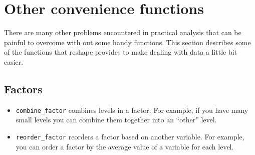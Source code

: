 \documentclass[oneside,letterpaper]{scrartcl}
\begin{document}
%
%

\newpage
\section{Other convenience functions}\label{sec:convenience}

There are many other problems encountered in practical analysis that can be painful to overcome with out some handy functions.  This section describes some of the functions that reshape provides to make dealing with data a little bit easier.  

\subsection{Factors}\label{sub:factor_related}

\begin{itemize}
	\item {\tt combine\_factor} combines levels in a factor.  For example, if you have many small levels you can combine them together into an ``other'' level.
	
	
	\item {\tt reorder\_factor} reorders a factor based on another variable.  For example, you can order a factor by the average value of a variable for each level.


\end{itemize}
\end{document}
